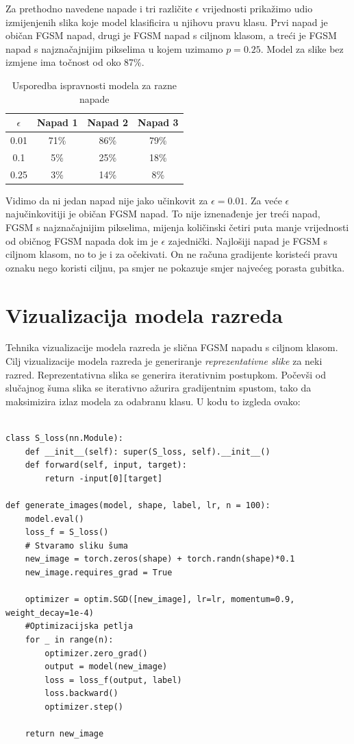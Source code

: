 Za prethodno navedene napade i tri različite $\epsilon$ vrijednosti prikažimo udio izmijenjenih slika koje model klasificira u njihovu pravu klasu. Prvi napad je običan FGSM napad, drugi je FGSM napad s ciljnom klasom, a treći je FGSM napad s najznačajnijim pikselima u kojem uzimamo $p = 0.25$. Model za slike bez izmjene ima točnost od oko 87\%.

\begin{table}[H]
	\centering
	\begin{tabular}{||c || c | c | c||} 
		\hline
		$\epsilon$ & Napad 1 & Napad 2 & Napad 3 \\ [0.5ex] 
		\hline\hline
		0.01 & 71\% & 86\% & 79\% \\ 
		0.1 & 5\% & 25\% & 18\% \\
		0.25 & 3\% & 14\% & 8\% \\ [1ex] 
		\hline
	\end{tabular}
	\caption{Usporedba ispravnosti modela za razne napade}
\end{table}

Vidimo da ni jedan napad nije jako učinkovit za $\epsilon = 0.01$. Za veće $\epsilon$ najučinkovitiji je običan FGSM napad. To nije iznenađenje jer treći napad, FGSM s najznačajnijim pikselima, mijenja količinski četiri puta manje vrijednosti od običnog FGSM napada dok im je $\epsilon$ zajednički. Najlošiji napad je FGSM s ciljnom klasom, no to je i za očekivati. On ne računa gradijente koristeći pravu oznaku nego koristi ciljnu, pa smjer ne pokazuje smjer najvećeg porasta gubitka.

\section{Vizualizacija modela razreda}

Tehnika vizualizacije modela razreda \cite{simonyan2014deep} je slična FGSM napadu s ciljnom klasom. Cilj vizualizacije modela razreda je generiranje \textit{reprezentativne slike} za neki razred. Reprezentativna slika se generira iterativnim postupkom. Počevši od slučajnog šuma slika se iterativno ažurira gradijentnim spustom, tako da maksimizira izlaz modela za odabranu klasu. U kodu to izgleda ovako:

\begin{verbatim}
	
class S_loss(nn.Module):
	def __init__(self): super(S_loss, self).__init__()
	def forward(self, input, target):
		return -input[0][target]

def generate_images(model, shape, label, lr, n = 100):
	model.eval()
	loss_f = S_loss()
	# Stvaramo sliku šuma
	new_image = torch.zeros(shape) + torch.randn(shape)*0.1
	new_image.requires_grad = True
	
	optimizer = optim.SGD([new_image], lr=lr, momentum=0.9, weight_decay=1e-4)
	#Optimizacijska petlja
	for _ in range(n):
		optimizer.zero_grad()
		output = model(new_image)
		loss = loss_f(output, label)
		loss.backward()
		optimizer.step()

	return new_image
\end{verbatim}

